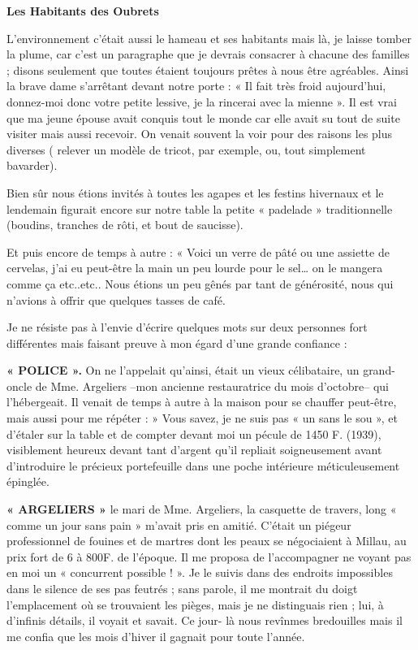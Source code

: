 \begin{center}
\textbf{Les Habitants des Oubrets}
\end{center}

L’environnement c’était aussi le hameau et ses habitants mais là, je laisse tomber la
plume, car c’est un paragraphe que je devrais consacrer à chacune des familles ;
disons seulement que toutes étaient toujours prêtes à nous être agréables. Ainsi la
brave dame s’arrêtant devant notre porte : « Il fait très froid aujourd’hui, donnez-moi
donc votre petite lessive, je la rincerai avec la mienne ». Il est vrai que ma jeune
épouse avait conquis tout le monde car elle avait su tout de suite visiter mais aussi
recevoir. On venait souvent la voir pour des raisons les plus diverses ( relever un
modèle de tricot, par exemple, ou, tout simplement bavarder).

Bien sûr nous étions invités à toutes les agapes et les festins hivernaux et le
lendemain figurait encore sur notre table la petite « padelade » traditionnelle
(boudins, tranches de rôti, et bout de saucisse).

Et puis encore de temps à autre : « Voici un verre de pâté ou une assiette de cervelas,
j’ai eu peut-être la main un peu lourde pour le sel… on le mangera comme ça
etc..etc.. Nous étions un peu gênés par tant de générosité, nous qui n’avions à
offrir que quelques tasses de café.

Je ne résiste pas à l’envie d’écrire quelques mots sur deux personnes fort différentes
mais faisant preuve à mon égard d’une grande confiance :

\textbf{« POLICE ».} On ne l’appelait qu’ainsi, était un vieux célibataire, un grand-oncle de
Mme. Argeliers --mon ancienne restauratrice du mois d’octobre-- qui l’hébergeait. Il
venait de temps à autre à la maison pour se chauffer peut-être, mais aussi pour me
répéter : » Vous savez, je ne suis pas « un sans le sou », et d’étaler sur la table et de
compter devant moi un pécule de 1450 F. (1939), visiblement heureux devant tant
d’argent qu’il repliait soigneusement avant d’introduire le précieux portefeuille dans
une poche intérieure méticuleusement épinglée.


\textbf{« ARGELIERS »} le mari de Mme. Argeliers, la casquette de travers, long « comme
un jour sans pain » m’avait pris en amitié. C’était un piégeur professionnel de fouines
et de martres dont les peaux se négociaient à Millau, au prix fort de 6 à 800F. de
l’époque. Il me proposa de l’accompagner ne voyant pas en moi un « concurrent
possible ! ». Je le suivis dans des endroits impossibles dans le silence de ses pas
feutrés ; sans parole, il me montrait du doigt l’emplacement où se trouvaient les
pièges, mais je ne distinguais rien ; lui, à d’infinis détails, il voyait et savait. Ce jour-
là nous revînmes bredouilles mais il me confia que les mois d’hiver il gagnait pour
toute l’année.

